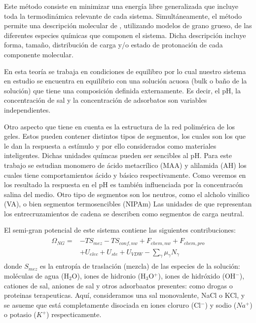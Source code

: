 Este m\'etodo consiste en minimizar una energ\'ia libre generalizada que incluye toda la termodin\'amica relevante de cada sistema.
Simult\'aneamente, el m\'etodo permite una descripci\'on molecular de , utilizando modelos de grano grueso, de las diferentes especies qu\'imicas que componen el sistema.
Dicha descripci\'on incluye forma, tama\~no, distribuci\'on de carga y/o estado de protonaci\'on de cada componente molecular.

En esta teor\'ia se trabaja en condiciones de equilibro por lo cual nuestro  sistema en estudio se encuentra en  equilibrio con una soluci\'on acuosa (bulk o ba\~no de la soluci\'on) que tiene una composici\'on  definida externamente.
Es decir, el pH, la concentraci\'on de sal y la concentraci\'on de adsorbatos son variables independientes.

Otro aspecto que tiene en cuenta  es la estructura de la red polim\'erica de los geles. Estos pueden contener distintos tipos de segmentos, los cuales son los que le dan la respuesta a est\'imulo y por ello considerados como materiales inteligentes. Dichas unidades qu\'imcas pueden ser sencibles al pH. Para este trabajo se estudian monomero de \'acido metacr\'ilico (MAA) y alilamida (AH) los cuales tiene comportamientos \'acido y b\'asico respectivamente. Como veremos en los resultado la respuesta en el pH es tambi\'en influenciada por la concentrac\'on salina del medio. 
Otro tipo de segmentos son los  neutros, como el alcholo vinilico (VA),  o bien segmentos termosencibles (NIPAm)
Las unidades de que representan los entrecruzamientos de cadena se describen como segmentos de carga neutral.

El semi-gran potencial de este sistema contiene las siguientes contribuciones:
\begin{align}
\begin{aligned}
\Omega_{NG}=& -TS_{mez} -TS_{conf,nw} + F_{chem,nw} + F_{chem,pro}\\
& + U_{elec} + U_{ste} + U_{VDW} - {\sum_{\gamma}{\mu_\gamma N_\gamma}}
\end{aligned}
\label{eq:semicano}
\end{align}
\noindent donde $S_{mez}$ es la entropía de traslación (mezcla) de las especies de la solución: moléculas de agua (H$_2$O), iones de hidronio (H$_3$O$^+$), iones de hidróxido (OH$^- $), cationes de sal, aniones de sal y otros adsorbaatos presentes: como drogas o proteinas terapeuticas.
Aquí, consideramos una sal monovalente, NaCl o KCl, y se asueme que está completamente disociada en iones cloruro (Cl$^-$) y sodio ($Na^+$) o potasio ($K^+$) respecticamente. 

